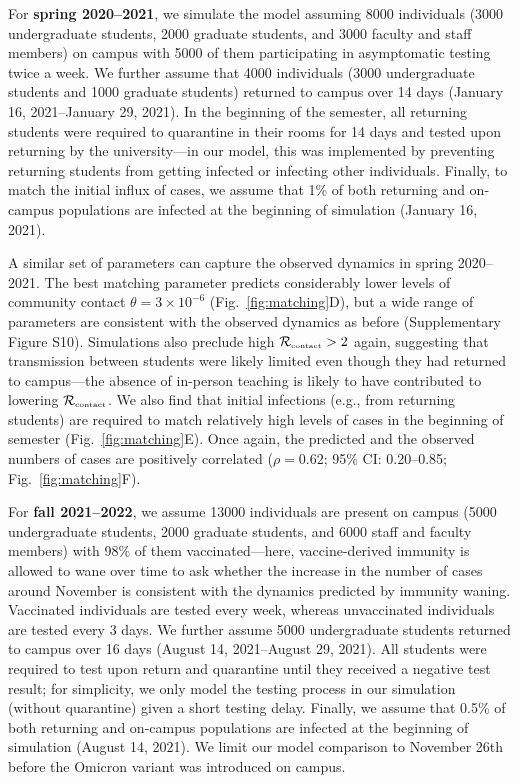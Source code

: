 \documentclass[12pt]{article}
\newcommand{\fref}[1]{Fig.~\ref{fig:#1}}
\newcommand{\Rx}[1]{\ensuremath{{\mathcal R}_{#1}}}
\newcommand{\Rc}{\Rx{\textrm{\tiny{contact}}}}
\begin{document}
For \textbf{spring 2020--2021}, we simulate the model assuming 8000 individuals (3000 undergraduate students, 2000 graduate students, and 3000 faculty and staff members) on campus with 5000 of them participating in asymptomatic testing twice a week.
We further assume that 4000 individuals (3000 undergraduate students and 1000 graduate students) returned to campus over 14 days (January 16, 2021--January 29, 2021).
In the beginning of the semester, all returning students were required to quarantine in their rooms for 14 days and tested upon returning by the university---in our model, this was implemented by preventing returning students from getting infected or infecting other individuals.
Finally, to match the initial influx of cases, we assume that 1\% of both returning and on-campus populations are infected at the beginning of simulation (January 16, 2021).

A similar set of parameters can capture the observed dynamics in spring 2020--2021.
The best matching parameter predicts considerably lower levels of community contact $\theta=3\times 10^{-6}$ (\fref{matching}D), but a wide range of parameters are consistent with the observed dynamics as before (Supplementary Figure S10). 
Simulations also preclude high $\Rc > 2$ again, suggesting that transmission between students were likely limited even though they had returned to campus---the absence of in-person teaching is likely to have contributed to lowering $\Rc$.
We also find that initial infections (e.g., from returning students) are required to match relatively high levels of cases in the beginning of semester (\fref{matching}E). 
Once again, the predicted and the observed numbers of cases are positively correlated ($\rho = 0.62$; 95\% CI: 0.20--0.85; \fref{matching}F).

For \textbf{fall 2021--2022}, we assume 13000 individuals are present on campus (5000 undergraduate students, 2000 graduate students, and 6000 staff and faculty members) with 98\% of them vaccinated---here, vaccine-derived immunity is allowed to wane over time to ask whether the increase in the number of cases around November is consistent with the dynamics predicted by immunity waning.
Vaccinated individuals are tested every week, whereas unvaccinated individuals are tested every 3 days. 
We further assume 5000 undergraduate students returned to campus over 16 days (August 14, 2021--August 29, 2021).
All students were required to test upon return and quarantine until they received a negative test result;
for simplicity, we only model the testing process in our simulation (without quarantine) given a short testing delay.
Finally, we assume that 0.5\% of both returning and on-campus populations are infected at the beginning of simulation (August 14, 2021).
We limit our model comparison to November 26th before the Omicron variant was introduced on campus.
\end{document}
